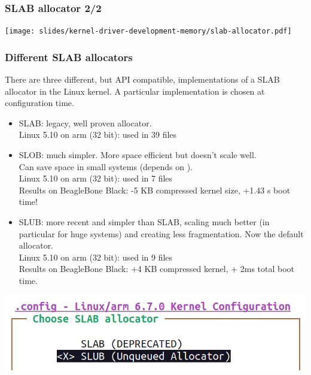 \begin{frame}
  \frametitle{SLAB allocator 2/2}
  \begin{center}
    \texttt{[image: slides/kernel-driver-development-memory/slab-allocator.pdf]}
  \end{center}
\end{frame}

\begin{frame}[fragile]
  \frametitle{Different SLAB allocators}
  \small
  There are three different, but API compatible, implementations of
  a SLAB allocator in the Linux kernel. A particular implementation
  is chosen at configuration time.
  \begin{itemize}
  \item SLAB: legacy, well proven allocator.\\
        Linux 5.10 on arm (32 bit): used in 39  files
  \item SLOB: much simpler. More space efficient but doesn't scale well.\\
        Can save space in small systems (depends on ). \\
        Linux 5.10 on arm (32 bit): used in 7  files \\
        Results on BeagleBone Black: -5 KB compressed kernel size, +1.43 s boot time!
  \item SLUB: more recent and simpler than
        SLAB, scaling much better (in particular for huge systems) and
        creating less fragmentation. Now the default allocator.\\
        Linux 5.10 on arm (32 bit): used in 9  files \\
	Results on BeagleBone Black: +4 KB compressed kernel, + 2ms total boot time.
  \end{itemize}
  \begin{center}
    \includegraphics[height=0.2\textheight]{slides/kernel-driver-development-memory/slab-screenshot.png}
  \end{center}
\end{frame}

